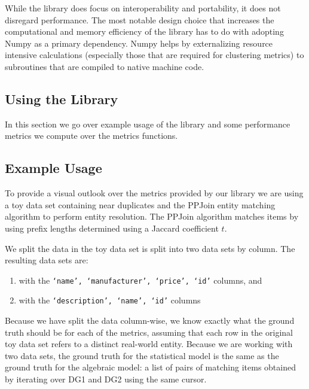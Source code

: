 \documentclass[a4paper,twoside]{article}
\begin{document}
    While the library does focus on interoperability and portability, it does
    not disregard performance.
    The most notable design choice that increases the computational and memory
    efficiency of the library has to do with adopting Numpy as a primary
    dependency.
    Numpy helps by externalizing resource intensive calculations (especially
    those that are required for clustering metrics) to subroutines that are
    compiled to native machine code.

    \subsection{Using the Library}\label{sec:usage}

    In this section we go over example usage of the library and some performance
    metrics we compute over the metrics functions.

    \subsection{Example Usage}

    To provide a visual outlook over the metrics provided by our library we are
    using a toy data set\cite{expdata2023} containing near duplicates and the
    PPJoin\cite{ppjoin} entity matching algorithm to perform entity resolution.
    The PPJoin algorithm matches items by using prefix lengths determined using
    a Jaccard coefficient $t$.
    
    We split the data in the toy data set is split into two data sets by column.
    The resulting data sets are:
    
    \begin{enumerate}[label={\bfseries DG\arabic*:},leftmargin=2cm]
        \item with the \texttt{`name', `manufacturer', `price', `id'} columns,
        and
        \item with the \texttt{`description', `name', `id'} columns\@
    \end{enumerate}

    Because we have split the data column-wise, we know exactly what the ground
    truth should be for each of the metrics, assuming that each row in the
    original toy data set refers to a distinct real-world entity.
    Because we are working with two data sets, the ground truth for the
    statistical model is the same as the ground truth for the algebraic model:
    a list of pairs of matching items obtained by iterating over DG1 and DG2
    using the same cursor.
\end{document}
